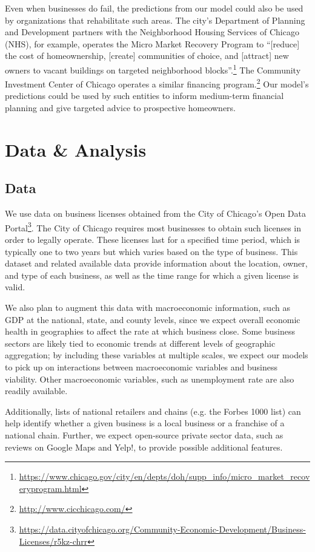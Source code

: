 Even when businesses do fail, the predictions from our model could also be used by organizations that rehabilitate such areas. The city's Department of Planning and Development partners with the Neighborhood Housing Services of Chicago (NHS), for example, operates the Micro Market Recovery Program to “[reduce] the cost of homeownership, [create] communities of choice, and [attract] new owners to vacant buildings on targeted neighborhood blocks”.\footnote{\url{https://www.chicago.gov/city/en/depts/doh/supp_info/micro_market_recoveryprogram.html}} The Community Investment Center of Chicago operates a similar financing program.\footnote{\url{http://www.cicchicago.com/}} Our model's predictions could be used by such entities to inform medium-term financial planning and give targeted advice to prospective homeowners. 
\section{Data \& Analysis}
\subsection{Data}
We use data on business licenses obtained from the City of Chicago's Open Data Portal\footnote{\url{https://data.cityofchicago.org/Community-Economic-Development/Business-Licenses/r5kz-chrr}}. The City of Chicago requires most businesses to obtain such licenses in order to legally operate. These licenses last for a specified time period, which is typically one to two years but which varies based on the type of business. This dataset and related available data provide information about the location, owner, and type of each business, as well as the time range for which a given license is valid. 

We also plan to augment this data with macroeconomic information, such as GDP at the national, state, and county levels, since we expect overall economic health in geographies to affect the rate at which business close. Some business sectors are likely tied to economic trends at different levels of geographic aggregation; by including these variables at multiple scales, we expect our models to pick up on interactions between macroeconomic variables and business viability. Other macroeconomic variables, such as unemployment rate are also readily available. 

Additionally, lists of national retailers and chains (e.g. the Forbes 1000 list) can help identify whether a given business is a local business or a franchise of a national chain. Further, we expect open-source private sector data, such as reviews on Google Maps and Yelp!, to provide possible additional features.

